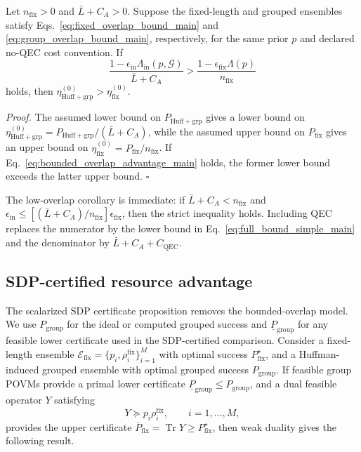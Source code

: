 \begin{proposition}\label{thm:bounded-overlap}
Let $n_{\mathrm{fix}}>0$ and $\bar L+C_A>0$. Suppose the fixed-length and grouped ensembles satisfy Eqs.~\eqref{eq:fixed_overlap_bound_main} and \eqref{eq:group_overlap_bound_main}, respectively, for the same prior $p$ and declared no-QEC cost convention. If
\begin{equation}
    \frac{1-\epsilon_{\mathrm{in}}\Lambda_{\mathrm{in}}(p,\mathcal G)}{\bar L+C_A}
    >
    \frac{1-\epsilon_{\mathrm{fix}}\Lambda(p)}{n_{\mathrm{fix}}}
    \label{eq:bounded_overlap_advantage_main}
\end{equation}
holds, then $\eta_{\mathrm{Huff+grp}}^{(0)}>\eta_{\mathrm{fix}}^{(0)}$.
\end{proposition}
\textit{Proof.} The assumed lower bound on $P_{\mathrm{Huff+grp}}$ gives a lower bound on $\eta_{\mathrm{Huff+grp}}^{(0)}=P_{\mathrm{Huff+grp}}/(\bar L+C_A)$, while the assumed upper bound on $P_{\mathrm{fix}}$ gives an upper bound on $\eta_{\mathrm{fix}}^{(0)}=P_{\mathrm{fix}}/n_{\mathrm{fix}}$. If Eq.~\eqref{eq:bounded_overlap_advantage_main} holds, the former lower bound exceeds the latter upper bound. \(\square\)

The low-overlap corollary is immediate: if $\bar L+C_A<n_{\mathrm{fix}}$ and $\epsilon_{\mathrm{in}}\le[(\bar L+C_A)/n_{\mathrm{fix}}]\epsilon_{\mathrm{fix}}$, then the strict inequality holds. Including QEC replaces the numerator by the lower bound in Eq.~\eqref{eq:full_bound_simple_main} and the denominator by $\bar L+C_A+C_{\mathrm{QEC}}$.

\subsection*{SDP-certified resource advantage}

The scalarized SDP certificate proposition removes the bounded-overlap model. We use $P_{\mathrm{group}}$ for the ideal or computed grouped success and $\underline P_{\mathrm{group}}$ for any feasible lower certificate used in the SDP-certified comparison. Consider a fixed-length ensemble $\mathcal E_{\mathrm{fix}}=\{p_i,\rho_i^{\mathrm{fix}}\}_{i=1}^M$ with optimal success $P^\star_{\mathrm{fix}}$, and a Huffman-induced grouped ensemble with optimal grouped success $P_{\mathrm{group}}$. If feasible group POVMs provide a primal lower certificate $\underline P_{\mathrm{group}}\le P_{\mathrm{group}}$, and a dual feasible operator $Y$ satisfying
\begin{equation}
    Y\succeq p_i\rho_i^{\mathrm{fix}},\qquad i=1,\ldots,M,
\end{equation}
provides the upper certificate $\overline P_{\mathrm{fix}}=\operatorname{Tr}Y\ge P^\star_{\mathrm{fix}}$, then weak duality gives the following result.

